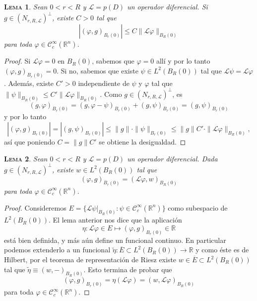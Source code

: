 \documentclass[11pt]{article}
\theoremstyle{colored}
\newtheorem{lemma}{\scshape Lema}
\newcommand{\R}{\mathbb{R}}
\newcommand{\C}{\mathscr{C}}
\newcommand{\ip}[1]{( #1 )}
\renewcommand{\L}{\mathscr{L}}
\begin{document}
\begin{lemma} \label{lema-cota-lp-r-R}Sean $0 < r < R$ y $\L = p(D)$ un operador diferencial. Si $g \in (N_{r,R,\L})^\perp$, existe $C > 0$ tal que
\[
|(\varphi,g)_{B_r(0)}| \leq C\|\L \varphi\|_{B_R(0)}
\]
para toda $\varphi \in \C_c^\infty(\R^n)$.
\end{lemma}
\begin{proof} Si $\L \varphi = 0$ en $B_R(0)$, sabemos que $\varphi = 0$ allí y por lo tanto $(\varphi,g)_{B_r(0)} = 0$. Si no, sabemos que existe $\psi \in L^2(B_R(0))$ tal que $\L \psi = \L \varphi$. Además, existe $C' > 0$ independiente de $\psi$ y $\varphi$ tal que $\|\psi\|_{B_R(0)} \leq C'\|\L \varphi\|_{B_R(0)}$. Como $g \in (N_{r,R,\L})^\perp$, es
\[
\ip{g,\varphi}_{B_r(0)} = \ip{g,\varphi-\psi}_{B_r(0)} + \ip{g,\psi}_{B_r(0)} = \ip{g,\psi}_{B_r(0)}
\]
y por lo tanto
\[
|(\varphi,g)_{B_r(0)}| = |\ip{g,\psi}_{B_r(0)}| \leq \|g\| \cdot \|\psi\|_{B_r(0)} \leq \|g\|C' \cdot \|\L \varphi\|_{B_R(0)},
\]
así que poniendo $C = \|g\|C'$ se obtiene la desigualdad.
\end{proof}

\begin{lemma} \label{lema-rep} Sean $0 < r < R$ y $\L = p(D)$ un operador diferencial. Dada $g \in (N_{r,R,\L})^\perp$, existe $w\in L^2(B_R(0))$ tal que
\[
(\varphi,g)_{B_r(0)} = (\L \varphi, w)_{B_R(0)}
\]
para toda $\varphi \in \C_c^\infty(\R^n)$.
\end{lemma}
\begin{proof} Consideremos $E = \{ \L\psi|_{B_R(0)} : \psi \in \C_c^\infty(\R^n)\}$ como subespacio de $L^2(B_R(0))$. El lema anterior nos dice que la aplicación 
\[
\eta : \L \varphi \in E \mapsto \ip{\varphi,g}_{B_r(0)} \in \R
\]
está bien definida, y más aún define un funcional continuo. En particular podemos extenderlo a un funcional $\widetilde{\eta} : \overline{E} \subset L^2(B_R(0)) \to \R$ y como éste es de Hilbert, por el teorema de representación de Riesz existe $w \in \overline{E} \subset L^2(B_R(0))$ tal que $\widetilde{\eta} \equiv (w,-)_{B_R(0)}$. Esto termina de probar que
\[
(\varphi,g)_{B_r(0)} = \eta(\L \varphi) = (w,\L \varphi)_{B_R(0)}
\]
para toda $\varphi \in \C_c^\infty(\R^n)$.
\end{proof}
\end{document}
